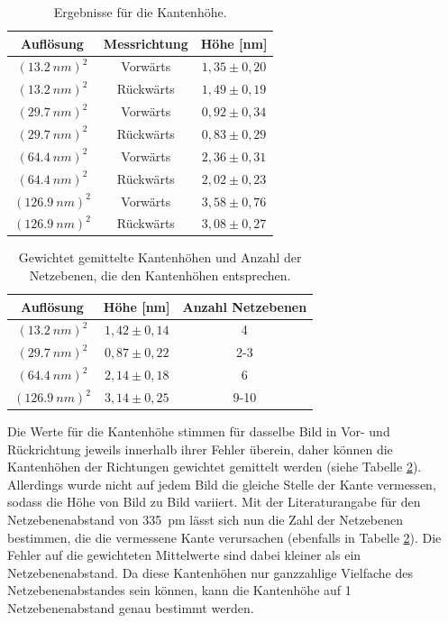 \documentclass[12pt,a4paper]{article}
\begin{document}
\begin{table}
\centering
\begin{tabular}{|c|c|c|}
\hline 
Auflösung & Messrichtung & Höhe [nm]\\ 
\hline 
$(\SI{13,2}{nm})^2$ & Vorwärts & $1,35 \pm 0,20$\\
\hline 
$(\SI{13,2}{nm})^2$ & Rückwärts & $1,49 \pm 0,19$\\
\hline 
$(\SI{29,7}{nm})^2$ & Vorwärts & $0,92 \pm 0,34$\\
\hline 
$(\SI{29,7}{nm})^2$ & Rückwärts & $0,83 \pm 0,29$\\
\hline 
$(\SI{64,4}{nm})^2$ & Vorwärts & $2,36 \pm 0,31$\\
\hline 
$(\SI{64,4}{nm})^2$ & Rückwärts & $2,02\pm 0,23$\\
\hline 
$(\SI{126,9}{nm})^2$ & Vorwärts & $3,58 \pm 0,76$\\
\hline 
$(\SI{126,9}{nm})^2$ & Rückwärts & $3,08 \pm 0,27$\\
\hline
\end{tabular} 
\caption{Ergebnisse für die Kantenhöhe.}
\label{tab:Kantenhöhe_Ergebnisse}
\end{table}

\begin{table}
\centering
\begin{tabular}{|c|c|c|}
\hline 
Auflösung & Höhe [nm] & Anzahl Netzebenen\\ 
\hline 
$(\SI{13,2}{nm})^2$ & $1,42 \pm 0,14$ & 4 \\
\hline 
$(\SI{29,7}{nm})^2$ & $0,87 \pm 0,22$ & 2-3 \\
\hline 
$(\SI{64,4}{nm})^2$ & $2,14 \pm 0,18$ & 6 \\
\hline 
$(\SI{126,9}{nm})^2$ & $3,14 \pm 0,25$ & 9-10 \\
\hline
\end{tabular} 
\caption{Gewichtet gemittelte Kantenhöhen und Anzahl der Netzebenen, die den Kantenhöhen entsprechen.}
\label{tab:Kantenhöhe_EndErgebnisse}
\end{table}

Die Werte für die Kantenhöhe stimmen für dasselbe Bild in Vor- und Rückrichtung jeweils innerhalb ihrer Fehler überein, daher können die Kantenhöhen der Richtungen gewichtet gemittelt werden (siehe Tabelle \ref{tab:Kantenhöhe_EndErgebnisse}). Allerdings wurde nicht auf jedem Bild die gleiche Stelle der Kante vermessen, sodass die Höhe von Bild zu Bild variiert. Mit der Literaturangabe für den Netzebenenabstand von \SI{335}{pm} lässt sich nun die Zahl der Netzebenen bestimmen, die die vermessene Kante verursachen (ebenfalls in Tabelle \ref{tab:Kantenhöhe_EndErgebnisse}). Die Fehler auf die gewichteten Mittelwerte sind dabei kleiner als ein Netzebenenabstand. Da diese Kantenhöhen nur ganzzahlige Vielfache des Netzebenenabstandes sein können, kann die Kantenhöhe auf 1 Netzebenenabstand genau bestimmt werden.
\end{document}

